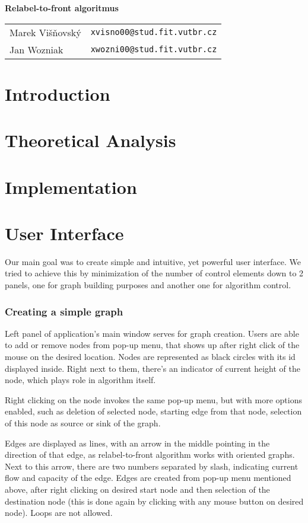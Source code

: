 \documentclass[a4paper,11pt]{article}
\begin{document}
\begin{center}{\LARGE\textbf{Relabel-to-front algoritmus}}\\[0.2cm]
\newcommand{\autor}[2]{#1&\texttt{#2@stud.fit.vutbr.cz}\tabularnewline}
\begin{tabular}{ll}
    \autor{Marek Višňovský}{xvisno00}
    \autor{Jan Wozniak}{xwozni00}
\end{tabular}
\end{center}

\section{Introduction}

\section{Theoretical Analysis}

\section{Implementation}


\section{User Interface}
Our main goal was to create simple and intuitive, yet powerful user interface. 
We tried to achieve this by minimization of the number of control elements down 
to 2 panels, one for graph building purposes and another one for algorithm control.

\subsubsection*{Creating a simple graph}
Left panel of application's main window serves for graph creation. Users are able 
to add or remove nodes from pop-up menu, that shows up after right click of the 
mouse on the desired location. Nodes are represented as black circles with its 
id displayed inside. Right next to them, there's an indicator of current height 
of the node, which plays role in algorithm itself.

Right clicking on the node invokes the same pop-up menu, but with more options 
enabled, such as deletion of selected node, starting edge from that node, selection 
of this node as source or sink of the graph.

Edges are displayed as lines, with an arrow in the middle pointing in the 
direction of that edge, as relabel-to-front algorithm works with oriented graphs. 
Next to this arrow, there are two numbers separated by slash, indicating current 
flow and capacity of the edge. Edges are created from pop-up menu mentioned above, 
after right clicking on desired start node and then selection of the destination 
node (this is done again by clicking with any mouse button on desired node). 
Loops are not allowed.
\end{document}
